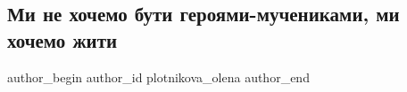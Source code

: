  
 
 
 
 

\subsection{Ми не хочемо бути  героями-мучениками,  ми хочемо жити}
\label{sec:27_04_2022.fb.plotnikova_olena.1.mi_ne_khochemo_buti_}

\ifcmt
 author_begin
   author_id plotnikova_olena
 author_end
\fi
